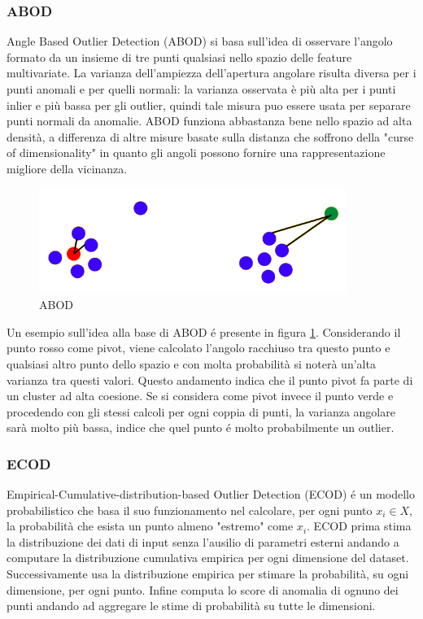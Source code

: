 \subsubsection{ABOD}
Angle Based Outlier Detection (ABOD) si basa sull'idea di osservare l'angolo formato da un insieme di tre punti qualsiasi nello spazio delle feature multivariate. La varianza dell'ampiezza dell'apertura angolare risulta diversa per i punti anomali e per quelli normali: la varianza osservata è più alta per i punti inlier e più bassa per gli outlier, quindi tale misura puo essere usata per separare punti normali da anomalie. ABOD funziona abbastanza bene nello spazio ad alta densità, a differenza di altre misure basate sulla distanza che soffrono della "curse of dimensionality" in quanto gli angoli possono fornire una rappresentazione migliore della vicinanza.
\begin{figure}[t]
	\centering
	\includegraphics[width=10cm, scale=1]{images/abod}
	\caption{ABOD}
	\label{abod}
\end{figure}
Un esempio sull'idea alla base di ABOD é presente in figura \ref{abod}.
Considerando il punto rosso come pivot, viene calcolato l'angolo racchiuso tra questo punto e qualsiasi altro punto dello spazio e con molta probabilità si noterà un'alta varianza tra questi valori. Questo andamento indica che il punto pivot fa parte di un cluster ad alta coesione.
Se si considera come pivot invece il punto verde e procedendo con gli stessi calcoli per ogni coppia di punti, la varianza angolare sarà molto più bassa, indice che quel punto é molto probabilmente un outlier.

\subsubsection{ECOD}
Empirical-Cumulative-distribution-based Outlier Detection (ECOD) é un modello probabilistico che basa il suo funzionamento nel calcolare, per ogni punto $x_i \in X$, la probabilità che esista un punto almeno "estremo" come $x_i$.
ECOD prima stima la distribuzione dei dati di input senza l'ausilio di parametri esterni andando a computare la distribuzione cumulativa empirica per ogni dimensione del dataset. Successivamente usa la distribuzione empirica per stimare la probabilità, su ogni dimensione, per ogni punto. Infine computa lo score di anomalia di ognuno dei punti andando ad aggregare le stime di probabilità su tutte le dimensioni.

